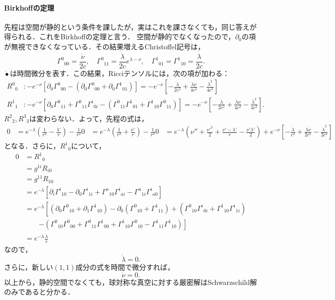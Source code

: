 \documentclass[a4paper]{ltjsreport}
\begin{document}
\paragraph{Birkhoffの定理}
先程は空間が静的という条件を課したが，実はこれを課さなくても，同じ答えが得られる．これをBirkhoffの定理と言う．
空間が静的でなくなったので，$\partial_0$の項が無視できなくなっている．その結果増えるChristoffel記号は，
\[{\Gamma^0}_{00}=\frac{\dot{\nu}}{2c}, \quad{\Gamma^0}_{11}=\frac{\dot{\lambda}}{2c}e^{\lambda - \nu}, \quad{\Gamma^1}_{01}={\Gamma^1}_{10}=\frac{\dot{\lambda}}{2c}.\]
$\dot\bullet$は時間微分を表す．この結果，Ricciテンソルには，次の項が加わる：
\begin{align*}
  {R^0}_0 &\colon -  e^{ - \nu}\left[\partial_0{\Gamma^0}_{00} - (\partial_0{\Gamma^0}_{00} + \partial_0{\Gamma^1}_{01})\right]
  = - e^{ - \nu}\left[ - \frac{\ddot{\lambda}}{2c^2} + \frac{\dot{\lambda}\dot{\nu}}{4c^2} - \frac{\dot{\lambda}^2}{4c^2}\right]\\
  {R^1}_1 &\colon -  e^{ - \nu}\left[\partial_0{\Gamma^0}_{11} + {\Gamma^0}_{11}{\Gamma^i}_{0i} - \left({\Gamma^0}_{11}{\Gamma^1}_{01} + {\Gamma^1}_{10}{\Gamma^0}_{11}\right)\right]
  = - e^{ - \nu}\left[ - \frac{\ddot{\lambda}}{2c^2} + \frac{\dot{\lambda}\dot{\nu}}{4c^2} - \frac{\dot{\lambda}^2}{4c^2}\right] .
\end{align*}
${R^2}_2, {R^3}_3$は変わらない．よって，先程の式は，
\begin{align*}
  0 &= e^{ - \lambda}\left(\frac{1}{r^2} - \frac{\lambda'}{r}\right) - \frac{1}{r^2}
  0 &= e^{ - \lambda}\left(\frac{1}{r^2} + \frac{\nu'}{r}\right) - \frac{1}{r^2}
  0 &= e^{ - \lambda}\left(\nu'' + \frac{\nu'^2}{2} + \frac{\nu' - \lambda'}{r} - \frac{\nu'\lambda'}{2}\right)
  + e^{ - \nu}\left[ - \frac{\ddot{\lambda}}{c^2} + \frac{\dot{\lambda}\dot{\nu}}{2c^2} - \frac{\dot{\lambda}^2}{2c^2}\right]
\end{align*}
となる．さらに，${R^1}_0$について，
\begin{align*}
  0 &= {R^1}_0\\
  &= g^{1i}R_{i0}\\
  &= g^{11}R_{10}\\
  &= e^{ - \lambda}\left[\partial_i{\Gamma^i}_{10} - \partial_0{\Gamma^i}_{1i} + {\Gamma^a}_{10}{\Gamma^i}_{ai} - {\Gamma^a}_{1i}{\Gamma^i}_{a0}\right]\\
  &= e^{ - \lambda}\left[\left(\partial_0{\Gamma^0}_{10} + \partial_1{\Gamma^1}_{10}\right) - \partial_0\left({\Gamma^0}_{10} + {\Gamma^1}_{11}\right) + \left({\Gamma^0}_{10}{\Gamma^i}_{0i} + {\Gamma^1}_{10}{\Gamma^i}_{1i}\right)\right.\\
  &\qquad\left. - \left({\Gamma^0}_{10}{\Gamma^0}_{00} + {\Gamma^0}_{11}{\Gamma^1}_{00} + {\Gamma^1}_{10}{\Gamma^0}_{10} - {\Gamma^1}_{11}{\Gamma^1}_{10}\right)\right]\\
  &= e^{ - \lambda}\frac{\dot{\lambda}}{r}
\end{align*}
なので，
\[\dot{\lambda}=0.\]
さらに，新しい$(1, 1)$成分の式を時間で微分すれば，
\[\dot{\nu}=0.\]
以上から，静的空間でなくても，球対称な真空に対する厳密解はSchwarzschild解のみであると分かる．
\end{document}
